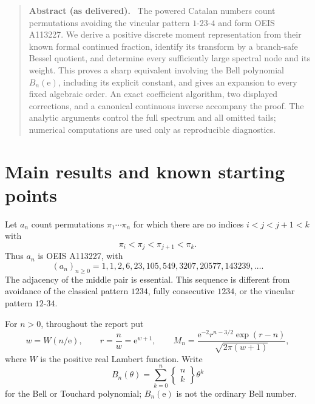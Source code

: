 \documentclass[11pt,letterpaper]{article}
\theoremstyle{remark}\newtheorem{remark}[theorem]{Remark}
\newcommand{\ee}{\mathrm e}
\newenvironment{partabstract}{\par\begin{quote}\small\textbf{Abstract (as delivered).}\ }{\end{quote}\par}
\begin{document}
\begin{partabstract}
The powered Catalan numbers count permutations avoiding the vincular pattern $1$-$23$-$4$ and form OEIS A113227. We derive a positive discrete moment representation from their known formal continued fraction, identify its transform by a branch-safe Bessel quotient, and determine every sufficiently large spectral node and its weight. This proves a sharp equivalent involving the Bell polynomial $B_n(\ee)$, including its explicit constant, and gives an expansion to every fixed algebraic order. An exact coefficient algorithm, two displayed corrections, and a canonical continuous inverse accompany the proof. The analytic arguments control the full spectrum and all omitted tails; numerical computations are used only as reproducible diagnostics.
\end{partabstract}

\section{Main results and known starting points}\label{pcn:sec:intro}
Let $a_n$ count permutations $\pi_1\cdots\pi_n$ for which there are no indices $i<j<j+1<k$ with
\[
 \pi_i<\pi_j<\pi_{j+1}<\pi_k.
\]
Thus $a_n$ is OEIS A113227, with
\[
 (a_n)_{n\ge0}=1,1,2,6,23,105,549,3207,20577,143239,\ldots.
\]
The adjacency of the middle pair is essential. This sequence is different from avoidance of the classical pattern $1234$, fully consecutive $1234$, or the vincular pattern $12$-$34$.

For $n>0$, throughout the report put
\begin{equation}\label{pcn:eq:rw}
 w=W(n/\ee),\qquad r=\frac n w=\ee^{w+1},\qquad
 M_n=\frac{\ee^{-2}r^{n-3/2}\exp(r-n)}{\sqrt{2\pi(w+1)}},
\end{equation}
where $W$ is the positive real Lambert function. Write
\[
 B_n(\theta)=\sum_{k=0}^n\left\{\!\begin{matrix}n\\k\end{matrix}\!\right\}\theta^k
\]
for the Bell or Touchard polynomial; $B_n(\ee)$ is not the ordinary Bell number.
\end{document}

